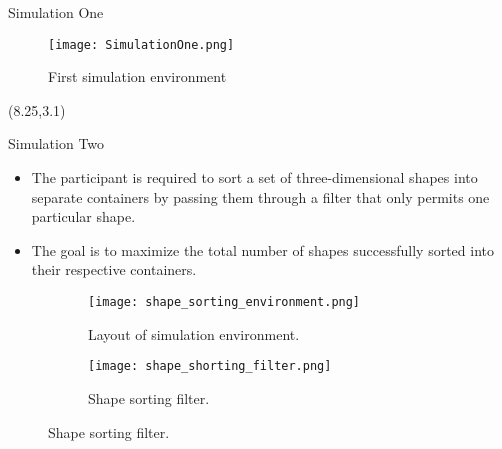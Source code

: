 \documentclass[22pt]{beamer}
\begin{document}
\begin{frame}[fragile]
\begin{textblock}{7.25}
\begin{block}{Simulation One}
\begin{figure}
  \centering
  \texttt{[image: SimulationOne.png]}
  \caption{First simulation environment}
\label{fig:simOne}
\end{figure}

\end{block}



\end{textblock}




\begin{textblock}{7.25}(8.25,3.1)


\begin{block}{Simulation Two}\newline
\begin{itemize}
\item The participant is required to sort a set of three-dimensional shapes into separate containers by passing them through a filter that only permits one particular shape.
\item The goal is to maximize the total number of shapes successfully sorted into their respective containers.
\end{itemize}
\begin{figure}
  \begin{subfigure}[b]{0.40\textwidth}
    \texttt{[image: shape\_sorting\_environment.png]}
        \caption{Layout of simulation environment.}
  \end{subfigure}
  \begin{subfigure}[b]{0.40\textwidth}
    \texttt{[image: shape\_shorting\_filter.png]}
        \caption{Shape sorting filter.}
    \end{subfigure}
 \end{figure}
\end{block}



\end{textblock}
\end{frame}
\end{document}
